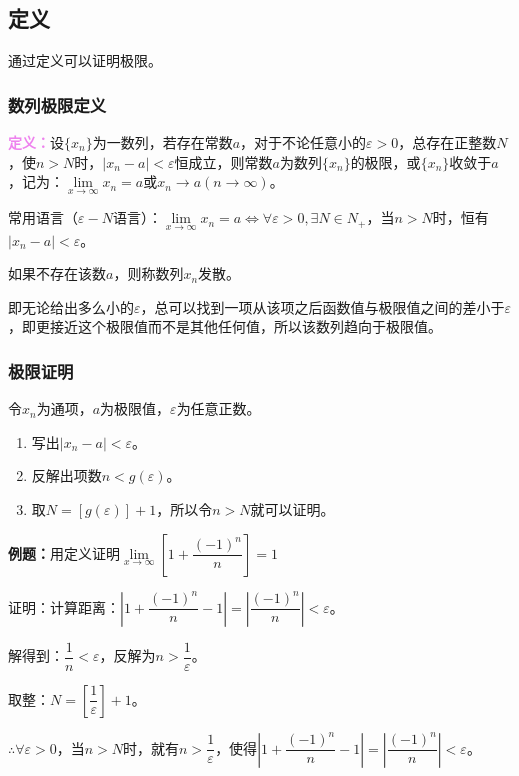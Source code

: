 \documentclass[UTF8, 12pt]{ctexart}
\begin{document}
\subsection{定义}

通过定义可以证明极限。

\subsubsection{数列极限定义}

\textcolor{violet}{\textbf{定义：}}设$\{x_n\}$为一数列，若存在常数$a$，对于不论任意小的$\varepsilon>0$，总存在正整数$N$，使$n>N$时，$\vert x_n-a\vert<\varepsilon$恒成立，则常数$a$为数列$\{x_n\}$的极限，或$\{x_n\}$收敛于$a$，记为：$\lim\limits_{x\to\infty}x_n=a$或$x_n\to a(n\to\infty)$。

常用语言（$\varepsilon-N$语言）：$\lim\limits_{x\to\infty}x_n=a\Leftrightarrow\forall\varepsilon>0,\exists N\in N_+$，当$n>N$时，恒有$\vert x_n-a\vert<\varepsilon$。

如果不存在该数$a$，则称数列$x_n$发散。

即无论给出多么小的$\varepsilon$，总可以找到一项从该项之后函数值与极限值之间的差小于$\varepsilon$，即更接近这个极限值而不是其他任何值，所以该数列趋向于极限值。

\subsubsection{极限证明}

令$x_n$为通项，$a$为极限值，$\varepsilon$为任意正数。

\begin{enumerate}
    \item 写出$\vert x_n-a|<\varepsilon$。
    \item 反解出项数$n<g(\varepsilon)$。
    \item 取$N=[g(\varepsilon)]+1$，所以令$n>N$就可以证明。
\end{enumerate}

\textbf{例题：}用定义证明$\lim\limits_{x\to\infty}\left[1+\dfrac{(-1)^n}{n}\right]=1$

证明：计算距离：$\left\vert 1+\dfrac{(-1)^n}{n}-1\right\vert=\left\vert\dfrac{(-1)^n}{n}\right\vert<\varepsilon$。

解得到：$\dfrac{1}{n}<\varepsilon$，反解为$n>\dfrac{1}{\varepsilon}$。

取整：$N=\left[\dfrac{1}{\varepsilon}\right]+1$。

$\therefore\forall\varepsilon>0$，当$n>N$时，就有$n>\dfrac{1}{\varepsilon}$，使得$\left\vert 1+\dfrac{(-1)^n}{n}-1\right\vert=\left\vert\dfrac{(-1)^n}{n}\right\vert<\varepsilon$。
\end{document}
